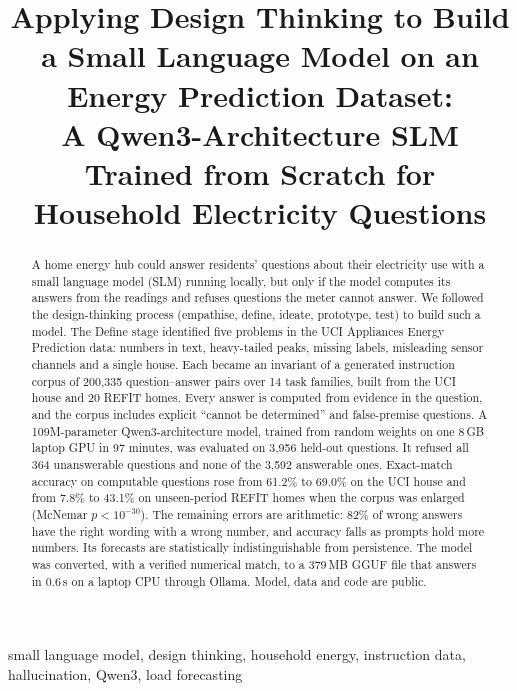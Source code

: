 \documentclass[conference]{IEEEtran}
\begin{document}
\title{Applying Design Thinking to Build a Small Language Model on an Energy Prediction Dataset:\\
A Qwen3-Architecture SLM Trained from Scratch for Household Electricity Questions}

\author{
}

\maketitle

\begin{abstract}
A home energy hub could answer residents' questions about their electricity use with a small language model (SLM)
running locally, but only if the model computes its answers from the readings and refuses questions the meter
cannot answer. We followed the design-thinking process (empathise, define, ideate, prototype, test) to build such a
model. The Define stage identified five problems in the UCI Appliances Energy Prediction data: numbers in text,
heavy-tailed peaks, missing labels, misleading sensor channels and a single house. Each became an invariant of a
generated instruction corpus of 200{,}335 question--answer pairs over 14 task families, built from the UCI house and
20 REFIT homes. Every answer is computed from evidence in the question, and the corpus includes explicit
``cannot be determined'' and false-premise questions. A 109M-parameter Qwen3-architecture model, trained from random
weights on one 8\,GB laptop GPU in 97 minutes, was evaluated on 3{,}956 held-out questions. It refused all 364
unanswerable questions and none of the 3{,}592 answerable ones. Exact-match accuracy on computable questions rose
from 61.2\% to 69.0\% on the UCI house and from 7.8\% to 43.1\% on unseen-period REFIT homes when the corpus was
enlarged (McNemar $p<10^{-30}$). The remaining errors are arithmetic: 82\% of wrong answers have the right wording
with a wrong number, and accuracy falls as prompts hold more numbers. Its forecasts are statistically
indistinguishable from persistence. The model was converted, with a verified numerical match, to a 379\,MB GGUF file
that answers in 0.6\,s on a laptop CPU through Ollama. Model, data and code are public.
\end{abstract}

\begin{IEEEkeywords}
small language model, design thinking, household energy, instruction data, hallucination, Qwen3, load forecasting
\end{IEEEkeywords}
\end{document}
